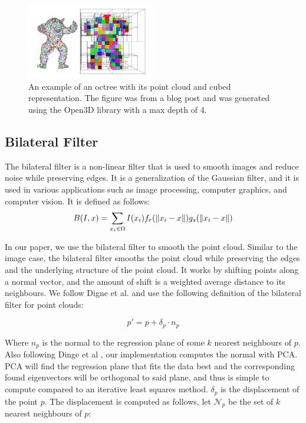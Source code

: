 \begin{figure}[H]
	\centering
	\includegraphics[width=0.5\textwidth]{octree_demo.png}
	\caption{An example of an octree with its point cloud and cubed representation. The figure was from a blog post \cite{octree_demo} and was generated using the Open3D library \cite{open3d} with a max depth of 4.}
	\label{fig:octree_depth}
\end{figure}

\subsection{Bilateral Filter}

The bilateral filter is a non-linear filter that is used to smooth images and reduce noise while preserving edges.
It is a generalization of the Gaussian filter, and it is used in various applications such as image processing, computer graphics, and computer vision.
It is defined as follows:
$$ B(I, x) = \sum\limits_{x_i \in \Omega} I(x_i) f_r(\left\lVert x_i - x\right\rVert)g_s(\left\lVert x_i - x\right\rVert)$$

In our paper, we use the bilateral filter to smooth the point cloud. Similar to the image case, the bilateral filter smooths the point cloud while preserving the edges and the underlying structure of the point cloud. It works by shifting points along a normal vector, and the amount of shift is a weighted average distance to its neighbours.
We follow Digne et al. \cite{3d_bilateral_filter_ipol} and use the following definition of the bilateral filter for point clouds:

\begin{equation} p' = p + \delta_p \cdot n_p\end{equation} 

Where $n_p$ is the normal to the regression plane of some $k$ nearest neighbours of $p$. Also following Dinge et al \cite{3d_bilateral_filter_ipol}, our implementation computes the normal with PCA. PCA will find the regression plane that fits the data best and the corresponding found eigenvectors will be orthogonal to said plane, and thus is simple to compute compared to an iterative least squares method. $\delta_p$ is the displacement of the point $p$.
The displacement is computed as follows, let $\mathcal{N}_p$ be the set of $k$ nearest neighbours of $p$:

